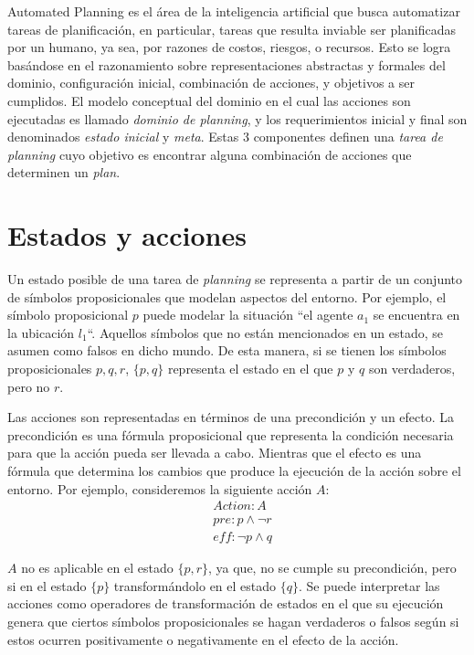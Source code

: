 Automated Planning es el área de la inteligencia artificial que busca
automatizar tareas de planificación, en particular, tareas que resulta inviable
ser planificadas por un humano, ya sea, por razones de costos, riesgos, o
recursos. Esto se logra basándose en el razonamiento sobre representaciones
abstractas y formales del dominio, configuración inicial, combinación de
acciones, y objetivos a ser cumplidos. El modelo conceptual del dominio en el
cual las acciones son ejecutadas es llamado \emph{dominio de planning}, y los
requerimientos inicial y final son denominados \emph{estado inicial} y
\emph{meta}. Estas 3 componentes definen una \emph{tarea de planning} cuyo
objetivo es encontrar alguna combinación de acciones que determinen un
\emph{plan}.

\section{Estados y acciones}

Un estado posible de una tarea de \emph{planning} se representa a partir de un
conjunto de símbolos proposicionales que modelan aspectos del entorno. Por
ejemplo, el símbolo proposicional $p$ puede modelar la situación ``el agente
$a_1$ se encuentra en la ubicación $l_1$``. Aquellos símbolos que no están
mencionados en un estado, se asumen como falsos en dicho mundo. De esta manera,
si se tienen los símbolos proposicionales $p,q,r$, $\{p, q\}$ representa el
estado en el que $p$ y $q$ son verdaderos, pero no $r$.

Las acciones son representadas en términos de una precondición y un efecto. La
precondición es una fórmula proposicional que representa la condición necesaria
para que la acción pueda ser llevada a cabo. Mientras que el efecto es una
fórmula que determina los cambios que produce la ejecución de la acción sobre el
entorno. Por ejemplo, consideremos la siguiente acción $A$:
\begin{align*}
    & Action : A \\
    & pre : p \land \neg r \\
    & \mathit{eff} : \neg p \land q
\end{align*}

$A$ no es aplicable en el estado $\{p, r\}$, ya que, no se cumple su
precondición, pero si en el estado $\{p\}$ transformándolo en el estado $\{q\}$.
Se puede interpretar las acciones como operadores de transformación de estados
en el que su ejecución genera que ciertos símbolos proposicionales se hagan
verdaderos o falsos según si estos ocurren positivamente o negativamente en el
efecto de la acción.

